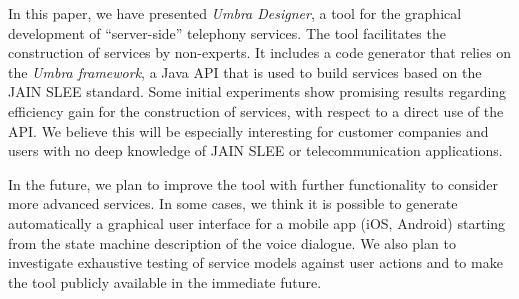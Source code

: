 In this paper, we have presented {\em Umbra Designer}, a tool for the graphical development of ``server-side'' telephony services.
The tool facilitates the construction of services by non-experts. It includes a code generator that relies on the
{\em Umbra framework}, a Java API that is used to build services based on the JAIN SLEE standard.
Some initial experiments show promising results regarding efficiency gain for the
construction of services, with respect to a direct use of the API. We believe this will be especially interesting for 
customer companies and users with no deep knowledge of JAIN SLEE or telecommunication applications.

In the future, we plan to improve the tool with further functionality to consider more advanced services. In some
cases, we think it is possible to generate automatically a graphical user interface for a mobile app (iOS, Android)
starting from the state machine description of the voice dialogue. We also plan to investigate exhaustive testing
of service models against user actions and to make the tool publicly available in the immediate future.